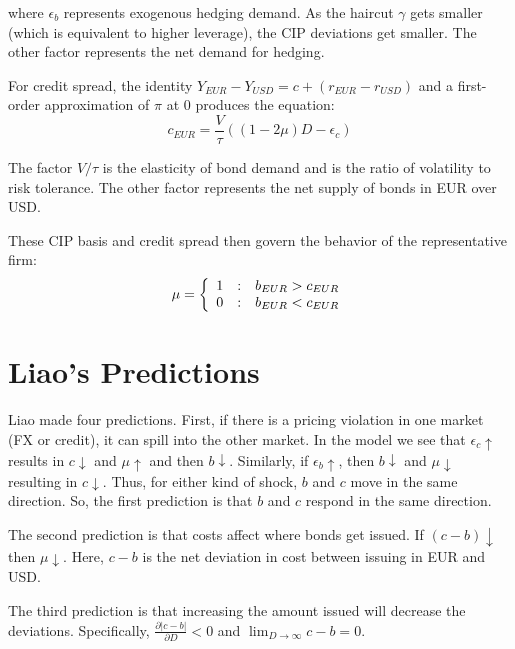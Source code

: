 \noindent where $\epsilon_b$ represents exogenous hedging demand.  As the haircut $\gamma$ gets smaller (which is equivalent to higher leverage), the CIP deviations get smaller.  The other factor represents the net demand for hedging.

For credit spread, the identity $Y_{EUR} - Y_{USD} = c + (r_{EUR} - r_{USD})$ and a first-order approximation of $\pi$ at 0 produces the equation:
\begin{equation}
  c_{EUR} = \frac{V}{\tau}( (1-2\mu)D - \epsilon_c) 
\end{equation}

\noindent The factor $V/\tau$ is the elasticity of bond demand and is the ratio of volatility to risk tolerance.  The other factor represents the net supply of bonds in EUR over USD. 

These CIP basis and credit spread then govern the behavior of the representative firm:
\begin{equation} 
  \mu = \left\{ \begin{array}{r@{\quad:\quad}l}
                                               1 & b_{EUR} > c_{EUR} \\ 
                                               0 & b_{EUR} < c_{EUR}
                          \end{array} \right.
\end{equation}


\section{Liao's Predictions}

Liao made four predictions.  First, \label{first_prediction} if there is a pricing violation in one market (FX or credit), it can spill into the other market.  In the model we see that $\epsilon_c \uparrow$ results in $c \downarrow$ and $ \mu \uparrow$ and then $b \downarrow$.  Similarly, if $\epsilon_b \uparrow$, then $b \downarrow$ and $ \mu \downarrow$ resulting in $c \downarrow$.  Thus, for either kind of shock, $b$ and $c$ move in the same direction.  So, the first prediction is that $b$ and $c$ respond in the same direction.

The second prediction is that costs affect where bonds get issued.  If $(c-b) \downarrow$ then $\mu \downarrow$.  Here, $c-b$ is the net deviation in cost between issuing in EUR and USD.

The third prediction is that increasing the amount issued will decrease the deviations.  Specifically, $\frac{\partial |c-b|}{\partial D} < 0$ and $\lim_{D \to \infty} c-b = 0$.  


